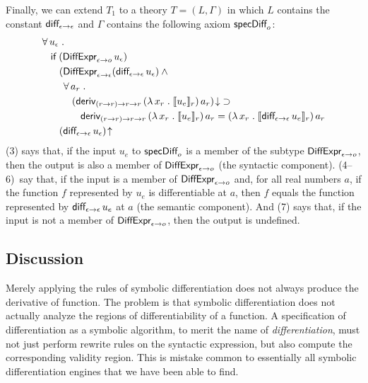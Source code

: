 \documentclass[fleqn]{llncs}
\begin{document}
Finally, we can extend $T_1$ to a theory $T = (L,\Gamma)$ in which $L$
contains the constant $\mbox{\sf diff}_{\epsilon \rightarrow \epsilon}$ and
$\Gamma$ contains the following axiom $\mbox{\sf specDiff}_o$:
\begin{align}\setcounter{equation}{0}
&
\ForallApp u_\epsilon \mdot\\
& \hspace*{2ex}
\If \; (\mname{DiffExpr}_{\epsilon \tarrow o} \, u_\epsilon)\\
& \hspace*{4ex}
(\mname{DiffExpr}_{\epsilon \tarrow \epsilon}(\mname{diff}_{\epsilon \tarrow \epsilon} \, u_\epsilon) \And {}\\
& \hspace*{5ex}
\ForallApp a_r \mdot\\
& \hspace*{7ex}
{(\mname{deriv}_{(r \tarrow r) \tarrow r \tarrow r}\,(\LambdaApp x_r \mdot \sembrack{u_e}_r)\,a_r)\IsDefApp} \Implies {}\\
& \hspace*{9ex}
\mname{deriv}_{(r \tarrow r) \tarrow r \tarrow r}\,(\LambdaApp x_r \mdot \sembrack{u_e}_r)\,a_r =
(\LambdaApp x_r \mdot \sembrack{\mname{diff}_{\epsilon \tarrow \epsilon} \, u_e}_r)\,a_r\\
& \hspace*{4ex}
(\mname{diff}_{\epsilon \tarrow \epsilon} \, u_\epsilon)\IsUndefApp
\end{align}
(3) says that, if the input $u_e$ to $\mbox{\sf specDiff}_o$ is a member
of the subtype $\mbox{\sf DiffExpr}_{\epsilon \rightarrow o}$, then the
output is also a member of $\mbox{\sf DiffExpr}_{\epsilon \rightarrow o}$
(the syntactic component). (\mbox{4--6})~say that, if the input is a
member of $\mbox{\sf DiffExpr}_{\epsilon \rightarrow o}$ and, for all real
numbers $a$, if the function $f$ represented by $u_e$ is
differentiable at $a$, then $f$ equals the function represented by
$\mbox{\sf diff}_{\epsilon \rightarrow \epsilon} \, u_e$ at $a$ (the semantic
component).  And (7) says that, if the input is not a member of
$\mbox{\sf DiffExpr}_{\epsilon \rightarrow o}$, then the output is undefined.

\subsection{Discussion}

Merely applying the rules of symbolic differentiation does not
always produce the derivative of  function. The problem is that
symbolic differentiation does not actually analyze the regions of
differentiability of a function. A specification of differentiation
as a symbolic algorithm, to merit the name of \emph{differentiation},
must not just perform rewrite rules on the syntactic expression, but
also compute the corresponding validity region. This is mistake common
to essentially all symbolic differentiation engines that we have been
able to find.
\end{document}
